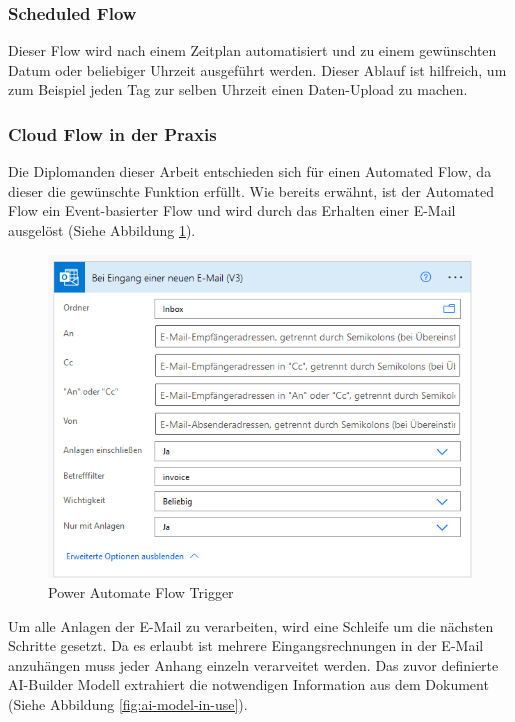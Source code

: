\subsubsection{Scheduled Flow}
Dieser Flow wird nach einem Zeitplan automatisiert und zu einem gewünschten Datum oder beliebiger Uhrzeit ausgeführt werden. Dieser Ablauf ist hilfreich, um zum Beispiel jeden Tag zur selben Uhrzeit einen Daten-Upload zu machen.

\subsubsection{Cloud Flow in der Praxis}
Die Diplomanden dieser Arbeit entschieden sich für einen Automated Flow, da dieser die gewünschte Funktion erfüllt. Wie bereits erwähnt, ist der Automated Flow ein Event-basierter Flow und wird durch das Erhalten einer E-Mail ausgelöst (Siehe Abbildung \ref{fig:flow-trigger}).

\begin{figure}[h]
    \centering
    \includegraphics[scale=0.9]{sections/cloud-computing/images/power-automate-flow/trigger.png}
    \caption{Power Automate Flow Trigger}
    \label{fig:flow-trigger}
\end{figure}

Um alle Anlagen der E-Mail zu verarbeiten, wird eine Schleife um die nächsten Schritte gesetzt. Da es erlaubt ist mehrere Eingangsrechnungen in der E-Mail anzuhängen muss jeder Anhang einzeln verarveitet werden. Das zuvor definierte AI-Builder Modell extrahiert die notwendigen Information aus dem Dokument (Siehe Abbildung \ref{fig:ai-model-in-use}).

